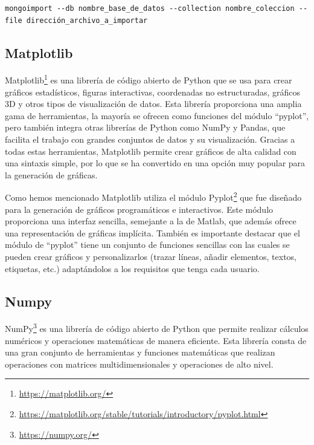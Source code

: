 \documentclass[a4paper, 12pt]{book}
\begin{document}
\begin{verbatim}
mongoimport --db nombre_base_de_datos --collection nombre_coleccion --file dirección_archivo_a_importar
\end{verbatim}

\subsection{Matplotlib} %
\label{sec:matplotlib} %

Matplotlib\footnote{\url{https://matplotlib.org/}} es una librería de código abierto de Python que se usa para crear gráficos estadísticos, figuras interactivas, coordenadas no estructuradas, gráficos 3D y otros tipos de visualización de datos.
Esta librería proporciona una amplia gama de herramientas, la mayoría se ofrecen como funciones del módulo ``pyplot'', pero también integra otras librerías de Python como NumPy y Pandas, que facilita el trabajo con grandes conjuntos de datos y su visualización.
Gracias a todas estas herramientas, Matplotlib permite crear gráficos de alta calidad con una sintaxis simple, por lo que se ha convertido en una opción muy popular para la generación de gráficas.


Como hemos mencionado Matplotlib utiliza el módulo Pyplot\footnote{\url{https://matplotlib.org/stable/tutorials/introductory/pyplot.html}} que fue diseñado para la generación de gráficos programáticos e interactivos.
Este módulo proporciona una interfaz sencilla, semejante a la de Matlab, que además ofrece una representación de gráficas implícita.
También es importante destacar que el módulo de ``pyplot'' tiene un conjunto de funciones sencillas con las cuales se pueden crear gráficos y personalizarlos (trazar líneas, añadir elementos, textos, etiquetas, etc.) adaptándolos a los requisitos que tenga cada usuario. 

 
\subsection{Numpy} %
\label{sec:numpy} %

NumPy\footnote{\url{https://numpy.org/}} es una librería de código abierto de Python que permite realizar cálculos numéricos y operaciones matemáticas de manera eficiente.
Esta librería consta de una gran conjunto de herramientas y funciones matemáticas que realizan operaciones con matrices multidimensionales y operaciones de alto nivel.  
\end{document}
